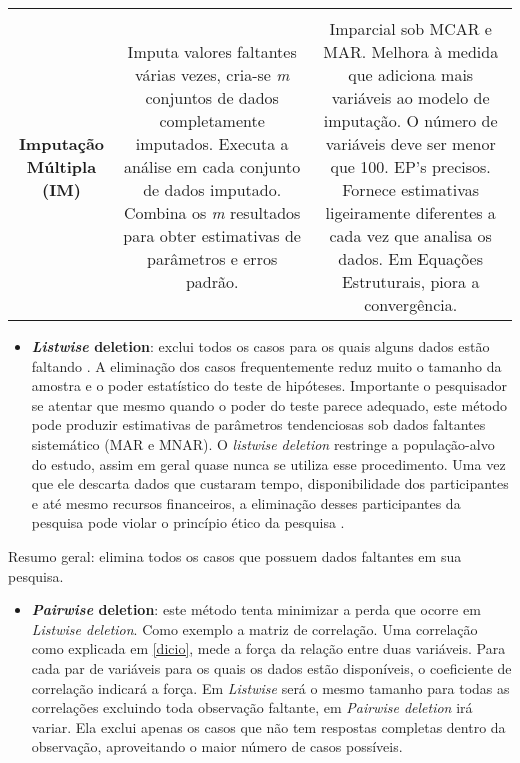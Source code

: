 \documentclass[
  openany]{book}
\providecommand{\tightlist}{%
  \setlength{\itemsep}{0pt}\setlength{\parskip}{0pt}}
\begin{document}
\begin{longtable}[]{@{}ccc@{}}
\begin{minipage}[t]{0.30\columnwidth}
\end{minipage}\tabularnewline
\begin{minipage}[t]{0.30\columnwidth}\centering
\textbf{Imputação Múltipla (IM)}\strut
\end{minipage} & \begin{minipage}[t]{0.30\columnwidth}\centering
Imputa valores faltantes várias vezes, cria-se \emph{m} conjuntos de dados completamente imputados. Executa a análise em cada conjunto de dados imputado. Combina os \emph{m} resultados para obter estimativas de parâmetros e erros padrão.\strut
\end{minipage} & \begin{minipage}[t]{0.30\columnwidth}\centering
Imparcial sob MCAR e MAR. Melhora à medida que adiciona mais variáveis ao modelo de imputação. O número de variáveis deve ser menor que 100. EP's precisos. Fornece estimativas ligeiramente diferentes a cada vez que analisa os dados. Em Equações Estruturais, piora a convergência.\strut
\end{minipage}\tabularnewline
\bottomrule
\end{longtable}

\begin{itemize}
\tightlist
\item
  \textbf{\emph{Listwise} deletion}: exclui todos os casos para os quais alguns dados estão faltando . A eliminação dos casos frequentemente reduz muito o tamanho da amostra e o poder estatístico do teste de hipóteses. Importante o pesquisador se atentar que mesmo quando o poder do teste parece adequado, este método pode produzir estimativas de parâmetros tendenciosas sob dados faltantes sistemático (MAR e MNAR). O \emph{listwise deletion} restringe a população-alvo do estudo, assim em geral quase nunca se utiliza esse procedimento. Uma vez que ele descarta dados que custaram tempo, disponibilidade dos participantes e até mesmo recursos financeiros, a eliminação desses participantes da pesquisa pode violar o princípio ético da pesquisa \citep{rosenthal1994science}.
\end{itemize}

Resumo geral: elimina todos os casos que possuem dados faltantes em sua pesquisa.

\begin{itemize}
\tightlist
\item
  \textbf{\emph{Pairwise} deletion}: este método tenta minimizar a perda que ocorre em \emph{Listwise deletion}. Como exemplo a matriz de correlação. Uma correlação como explicada em \ref{dicio}, mede a força da relação entre duas variáveis. Para cada par de variáveis para os quais os dados estão disponíveis, o coeficiente de correlação indicará a força. Em \emph{Listwise} será o mesmo tamanho para todas as correlações excluindo toda observação faltante, em \emph{Pairwise deletion} irá variar. Ela exclui apenas os casos que não tem respostas completas dentro da observação, aproveitando o maior número de casos possíveis.
\end{itemize}
\end{document}
